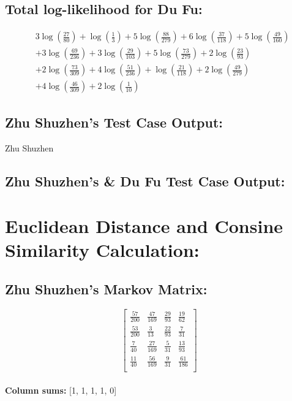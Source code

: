 \documentclass[12pt]{article}
\begin{document}
\subsection*{Total log-likelihood for Du Fu:}
\[
\begin{aligned}
    &3\log\left(\frac{27}{80}\right) + \log\left(\frac{1}{3}\right) + 5\log\left(\frac{88}{279}\right) + 6\log\left(\frac{37}{118}\right) + 5\log\left(\frac{49}{160}\right) \\
    &+ 3\log\left(\frac{69}{236}\right) + 3\log\left(\frac{29}{103}\right) + 5\log\left(\frac{73}{279}\right) + 2\log\left(\frac{23}{93}\right) \\
    &+ 2\log\left(\frac{73}{309}\right) + 4\log\left(\frac{51}{236}\right) + \log\left(\frac{21}{118}\right) + 2\log\left(\frac{49}{279}\right) \\
    &+ 4\log\left(\frac{46}{309}\right) + 2\log\left(\frac{1}{10}\right)
\end{aligned}
\]

\subsection*{Zhu Shuzhen's Test Case Output: }
Zhu Shuzhen

\subsection*{Zhu Shuzhen's \& Du Fu Test Case Output: }


\section*{Euclidean Distance and Consine Similarity Calculation: }

\subsection*{Zhu Shuzhen's Markov Matrix:}
\[
\begin{bmatrix}
    \frac{57}{200} & \frac{47}{169} & \frac{29}{93} & \frac{19}{62} \\
    \frac{53}{200} & \frac{3}{13} & \frac{22}{93} & \frac{7}{31} \\
    \frac{7}{40} & \frac{27}{169} & \frac{5}{31} & \frac{13}{93} \\
    \frac{11}{40} & \frac{56}{169} & \frac{9}{31} & \frac{61}{186} \\
\end{bmatrix}
\]
\\
\textbf{Column sums:} [1, 1, 1, 1, 0]
\end{document}
